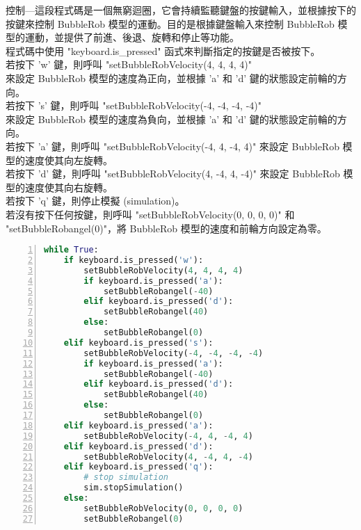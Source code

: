 控制---這段程式碼是一個無窮迴圈，它會持續監聽鍵盤的按鍵輸入，並根據按下的按鍵來控制 BubbleRob 模型的運動。目的是根據鍵盤輸入來控制 BubbleRob 模型的運動，並提供了前進、後退、旋轉和停止等功能。 \\
程式碼中使用 "keyboard.is_pressed" 函式來判斷指定的按鍵是否被按下。 \\
若按下 'w' 鍵，則呼叫 "setBubbleRobVelocity(4, 4, 4, 4)" \\
來設定 BubbleRob 模型的速度為正向，並根據 'a' 和 'd' 鍵的狀態設定前輪的方向。 \\
若按下 's' 鍵，則呼叫 "setBubbleRobVelocity(-4, -4, -4, -4)" \\
來設定 BubbleRob 模型的速度為負向，並根據 'a' 和 'd' 鍵的狀態設定前輪的方向。 \\
若按下 'a' 鍵，則呼叫 "setBubbleRobVelocity(-4, 4, -4, 4)" 來設定 BubbleRob 模型的速度使其向左旋轉。 \\
若按下 'd' 鍵，則呼叫 "setBubbleRobVelocity(4, -4, 4, -4)" 來設定 BubbleRob 模型的速度使其向右旋轉。 \\
若按下 'q' 鍵，則停止模擬 (simulation)。 \\
若沒有按下任何按鍵，則呼叫 "setBubbleRobVelocity(0, 0, 0, 0)" 和 "setBubbleRobangel(0)"，將 BubbleRob 模型的速度和前輪方向設定為零。
\begin{lstlisting}[language=Python, frame=single, numbers=left, captionpos=b, basicstyle=\ttfamily\small,showstringspaces=false, breaklines=true, tabsize=4, xleftmargin=15pt]
while True:
    if keyboard.is_pressed('w'):
        setBubbleRobVelocity(4, 4, 4, 4)
        if keyboard.is_pressed('a'):
            setBubbleRobangel(-40)
        elif keyboard.is_pressed('d'):
            setBubbleRobangel(40)
        else:
            setBubbleRobangel(0)
    elif keyboard.is_pressed('s'):
        setBubbleRobVelocity(-4, -4, -4, -4)
        if keyboard.is_pressed('a'):
            setBubbleRobangel(-40)
        elif keyboard.is_pressed('d'):
            setBubbleRobangel(40)
        else:
            setBubbleRobangel(0)
    elif keyboard.is_pressed('a'):
        setBubbleRobVelocity(-4, 4, -4, 4)
    elif keyboard.is_pressed('d'):
        setBubbleRobVelocity(4, -4, 4, -4)
    elif keyboard.is_pressed('q'):
        # stop simulation
        sim.stopSimulation()
    else:
        setBubbleRobVelocity(0, 0, 0, 0)
        setBubbleRobangel(0)
\end{lstlisting}
\newpage

